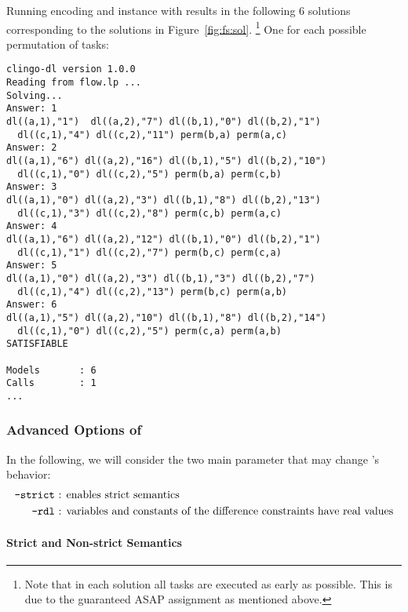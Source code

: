 \begin{example}
Running encoding and instance with  results in the following $6$ solutions
corresponding to the solutions in Figure~\ref{fig:fs:sol}.%
\footnote{Note that in each solution all tasks are executed as early as possible.
  This is due to the guaranteed ASAP assignment as mentioned above.}
One for each possible permutation of tasks:
 \begin{lstlisting}[numbers=none]
clingo-dl version 1.0.0
Reading from flow.lp ...
Solving...
Answer: 1
dl((a,1),"1")  dl((a,2),"7") dl((b,1),"0") dl((b,2),"1") 
  dl((c,1),"4") dl((c,2),"11") perm(b,a) perm(a,c)
Answer: 2
dl((a,1),"6") dl((a,2),"16") dl((b,1),"5") dl((b,2),"10") 
  dl((c,1),"0") dl((c,2),"5") perm(b,a) perm(c,b)
Answer: 3
dl((a,1),"0") dl((a,2),"3") dl((b,1),"8") dl((b,2),"13") 
  dl((c,1),"3") dl((c,2),"8") perm(c,b) perm(a,c)
Answer: 4
dl((a,1),"6") dl((a,2),"12") dl((b,1),"0") dl((b,2),"1") 
  dl((c,1),"1") dl((c,2),"7") perm(b,c) perm(c,a)
Answer: 5
dl((a,1),"0") dl((a,2),"3") dl((b,1),"3") dl((b,2),"7") 
  dl((c,1),"4") dl((c,2),"13") perm(b,c) perm(a,b)
Answer: 6
dl((a,1),"5") dl((a,2),"10") dl((b,1),"8") dl((b,2),"14") 
  dl((c,1),"0") dl((c,2),"5") perm(c,a) perm(a,b)
SATISFIABLE

Models       : 6
Calls        : 1
...
\end{lstlisting}
\end{example}

\subsubsection{Advanced Options of }\label{sec:dl:advanced}

In the following, we will consider the two main parameter that may change 's behavior:
\begin{align*}
 \texttt{--strict}& \text{ : enables strict semantics}\\
 \texttt{--rdl}& \text{ : variables and constants of the difference constraints have real values} 
\end{align*}

\paragraph{Strict and Non-strict Semantics}

